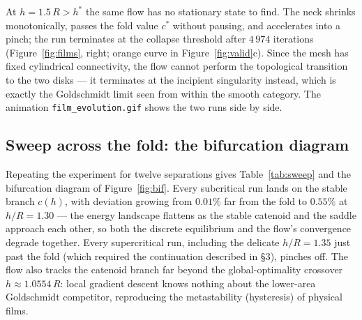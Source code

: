 \documentclass[11pt,a4paper]{article}
\begin{document}
At $h=1.5\,R>h^{*}$ the same flow has no stationary state to find. The neck
shrinks monotonically, passes the fold value $c^{*}$ without pausing, and
accelerates into a pinch; the run terminates at the collapse threshold after
$4\,974$ iterations (Figure~\ref{fig:films}, right; orange curve in
Figure~\ref{fig:valid}c). Since the mesh has fixed cylindrical connectivity,
the flow cannot perform the topological transition to the two disks --- it
terminates at the incipient singularity instead, which is exactly the
Goldschmidt limit seen from within the smooth category. The animation
\texttt{film\_evolution.gif} shows the two runs side by side.

\subsection{Sweep across the fold: the bifurcation diagram}

Repeating the experiment for twelve separations gives
Table~\ref{tab:sweep} and the bifurcation diagram of
Figure~\ref{fig:bif}. Every subcritical run lands on the stable branch
$c(h)$, with deviation growing from $0.01\%$ far from the fold to $0.55\%$ at
$h/R=1.30$ --- the energy landscape flattens as the stable catenoid and the
saddle approach each other, so both the discrete equilibrium and the flow's
convergence degrade together. Every supercritical run, including the delicate
$h/R=1.35$ just past the fold (which required the continuation described in
\S3), pinches off. The flow also tracks the catenoid branch far beyond the
global-optimality crossover $h\approx1.0554\,R$: local gradient descent knows
nothing about the lower-area Goldschmidt competitor, reproducing the
metastability (hysteresis) of physical films.
\end{document}
